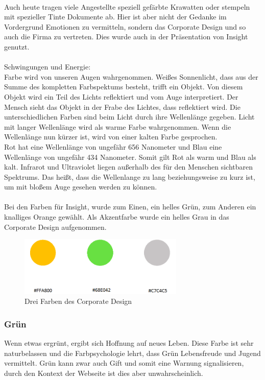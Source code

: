 \leavevmode \\
Auch heute tragen viele Angestellte speziell gefärbte Krawatten oder stempeln mit spezieller Tinte Dokumente ab. Hier ist aber nicht der Gedanke im Vordergrund Emotionen zu vermitteln, sondern das Corporate Design und so auch die Firma zu vertreten. Dies wurde auch in der Präsentation von Insight genutzt.\cite{farbwirkung}
\leavevmode \\
\leavevmode \\
Schwingungen und Energie:
\leavevmode \\
Farbe wird von unseren Augen wahrgenommen. Weißes Sonnenlicht, dass aus der Summe des kompletten Farbspektums besteht, trifft ein Objekt. Von diesem Objekt wird ein Teil des Lichts reflektiert und vom Auge interpretiert. Der Mensch sieht das Objekt in der Frabe des Lichtes, dass reflektiert wird. Die unterschiedlichen Farben sind beim Licht durch ihre Wellenlänge gegeben. Licht mit langer Wellenlänge wird als warme Farbe wahrgenommen. Wenn die Wellenlänge nun kürzer ist, wird von einer kalten Farbe gesprochen.\cite{farbwirkung}
\leavevmode \\
Rot hat eine Wellenlänge von ungefähr 656 Nanometer und Blau eine Wellenlänge von ungefähr 434 Nanometer. Somit gilt Rot als warm und Blau als kalt. Infrarot und Ultraviolet liegen außerhalb des für den Menschen sichtbaren Spektrums. Das heißt, dass die Wellenlange zu lang beziehungsweise zu kurz ist, um mit bloßem Auge gesehen werden zu können.\cite{farbwirkung}
\leavevmode \\
\leavevmode \\
Bei den Farben für Insight, wurde zum Einen, ein helles Grün, zum Anderen ein knalliges Orange gewählt. Als Akzentfarbe wurde ein helles Grau in das Corporate Design aufgenommen.

\begin{figure}[H] 
  \centering
     \includegraphics[width=0.7\textwidth]{design_abb1.png}
  \caption{Drei Farben des Corporate Design}
\end{figure}

\subsubsection{Grün}
Wenn etwas ergrünt, ergibt sich Hoffnung auf neues Leben. Diese Farbe ist sehr naturbelassen und die Farbpsychologie lehrt, dass Grün Lebensfreude und Jugend vermittelt. Grün kann zwar auch Gift und somit eine Warnung signalisieren, durch den Kontext der Webseite ist dies aber unwahrscheinlich. \cite{farblehre}

